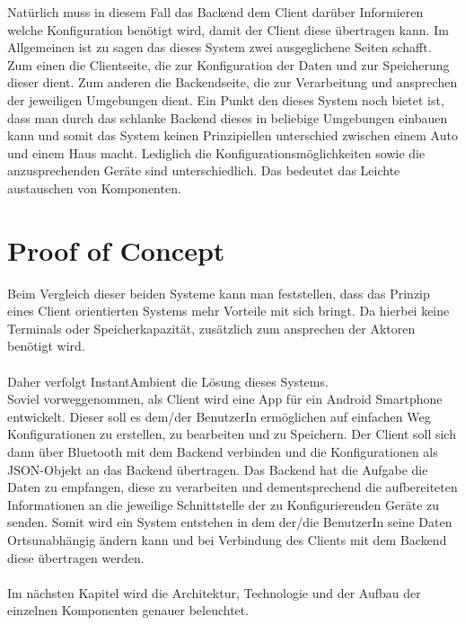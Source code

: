 Natürlich muss in diesem Fall das Backend dem Client darüber Informieren welche Konfiguration benötigt wird, damit der Client diese übertragen kann. Im Allgemeinen ist zu sagen das dieses System zwei ausgeglichene Seiten schafft. Zum einen die Clientseite, die zur Konfiguration der Daten und zur Speicherung dieser dient. Zum anderen die Backendseite, die zur Verarbeitung und ansprechen der jeweiligen Umgebungen dient. Ein Punkt den dieses System noch bietet ist, dass man durch das schlanke Backend dieses in beliebige Umgebungen einbauen kann und somit das System keinen Prinzipiellen unterschied zwischen einem Auto und einem Haus macht. Lediglich die Konfigurationsmöglichkeiten sowie die anzusprechenden Geräte sind unterschiedlich. Das bedeutet das Leichte austauschen von Komponenten.

\section{Proof of Concept}

Beim Vergleich dieser beiden Systeme kann man feststellen, dass das Prinzip eines Client orientierten Systems mehr Vorteile mit sich bringt. Da hierbei keine Terminals oder Speicherkapazität, zusätzlich zum ansprechen der Aktoren benötigt wird. 
\\\\ 
Daher verfolgt InstantAmbient die Lösung dieses Systems. \\
Soviel vorweggenommen, als Client wird eine App für ein Android Smartphone entwickelt. Dieser soll es dem/der BenutzerIn ermöglichen auf einfachen Weg Konfigurationen zu erstellen, zu bearbeiten und zu Speichern. Der Client soll sich dann über Bluetooth mit dem Backend verbinden und die Konfigurationen als JSON-Objekt an das Backend übertragen. Das Backend hat die Aufgabe die Daten zu empfangen, diese zu verarbeiten und dementsprechend die aufbereiteten Informationen an die jeweilige Schnittstelle der zu Konfigurierenden Geräte zu senden. 
Somit wird ein System entstehen in dem der/die BenutzerIn seine Daten Ortsunabhängig ändern kann und bei Verbindung des Clients mit dem Backend diese übertragen werden. 
\\\\
Im nächsten Kapitel wird die Architektur, Technologie und der Aufbau der einzelnen Komponenten genauer beleuchtet.
